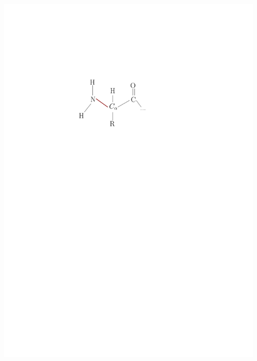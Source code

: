 \documentclass[xetex]{beamer}
\begin{document}
\begin{frame}
\begin{columns}
\begin{column}[t]{.5\textwidth}
\begin{center}
					\includegraphics[height=.30\textheight, keepaspectratio]{./picts/aminoAcid.pdf}
				\end{center}
			\end{column}
		\end{columns}
	\end{frame}
\end{document}
